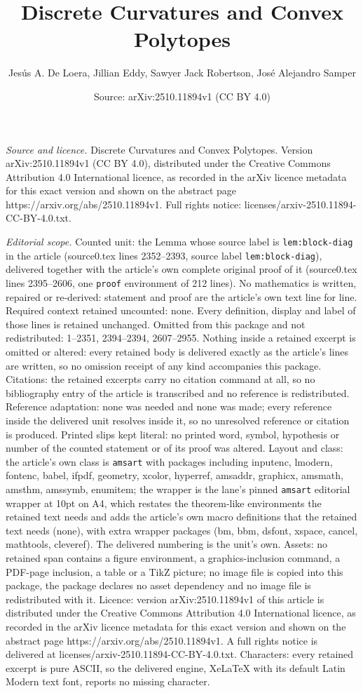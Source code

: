 \documentclass[10pt,a4paper]{amsart}
\title[Discrete Curvatures and Convex Polytopes]{Discrete Curvatures and Convex Polytopes}
\author{Jes\'us A. De Loera, Jillian Eddy, Sawyer Jack Robertson, Jos\'e Alejandro Samper}
\date{Source: arXiv:2510.11894v1 (CC BY 4.0)}
\begin{document}
\maketitle

\noindent\emph{Source and licence.} Discrete Curvatures and Convex Polytopes. Version arXiv:2510.11894v1 (CC BY 4.0), distributed under the Creative Commons Attribution 4.0 International licence, as recorded in the arXiv licence metadata for this exact version and shown on the abstract page https://arxiv.org/abs/2510.11894v1. Full rights notice: licenses/arxiv-2510.11894-CC-BY-4.0.txt.\par\smallskip

\noindent\textit{Editorial scope.} Counted unit: the Lemma whose source label is \texttt{lem:block-diag} in the article (source0.tex lines 2352--2393, source label \texttt{lem:block-diag}), delivered together with the article's own complete original proof of it (source0.tex lines 2395--2606, one \texttt{proof} environment of 212 lines). No mathematics is written, repaired or re-derived: statement and proof are the article's own text line for line. Required context retained uncounted: none. Every definition, display and label of those lines is retained unchanged. Omitted from this package and not redistributed: 1--2351, 2394--2394, 2607--2955. Nothing inside a retained excerpt is omitted or altered: every retained body is delivered exactly as the article's lines are written, so no omission receipt of any kind accompanies this package. Citations: the retained excerpts carry no citation command at all, so no bibliography entry of the article is transcribed and no reference is redistributed. Reference adaptation: none was needed and none was made; every reference inside the delivered unit resolves inside it, so no unresolved reference or citation is produced. Printed slips kept literal: no printed word, symbol, hypothesis or number of the counted statement or of its proof was altered. Layout and class: the article's own class is \texttt{amsart} with packages including inputenc, lmodern, fontenc, babel, ifpdf, geometry, xcolor, hyperref, amsaddr, graphicx, amsmath, amsthm, amssymb, enumitem; the wrapper is the lane's pinned \texttt{amsart} editorial wrapper at 10pt on A4, which restates the theorem-like environments the retained text needs and adds the article's own macro definitions that the retained text needs (none), with extra wrapper packages (bm, bbm, dsfont, xspace, cancel, mathtools, cleveref). The delivered numbering is the unit's own. Assets: no retained span contains a figure environment, a graphics-inclusion command, a PDF-page inclusion, a table or a TikZ picture; no image file is copied into this package, the package declares no asset dependency and no image file is redistributed with it. Licence: version arXiv:2510.11894v1 of this article is distributed under the Creative Commons Attribution 4.0 International licence, as recorded in the arXiv licence metadata for this exact version and shown on the abstract page https://arxiv.org/abs/2510.11894v1. A full rights notice is delivered at licenses/arxiv-2510.11894-CC-BY-4.0.txt. Characters: every retained excerpt is pure ASCII, so the delivered engine, XeLaTeX with its default Latin Modern text font, reports no missing character.
\end{document}
